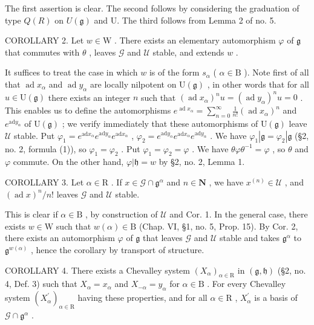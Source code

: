 The first assertion is clear. The second follows by considering the graduation of type \(Q(R)\) on \(U(\mathfrak{g})\) and U. The third follows from Lemma 2 of no. 5.

COROLLARY 2. Let \(w \in \mathrm{W}\) . There exists an elementary automorphism \(\varphi\) of \(\mathfrak{g}\) that commutes with \(\theta\) , leaves \(\mathcal{G}\) and \(\mathcal{U}\) stable, and extends \(w\) .

It suffices to treat the case in which \(w\) is of the form \(s_{\alpha}\) ( \(\alpha \in \mathrm{B}\) ). Note first of all that \(\operatorname{ad} x_{\alpha}\) and \(\operatorname{ad} y_{\alpha}\) are locally nilpotent on \(\mathrm{U}(\mathfrak{g})\) , in other words that for all \(u \in \mathrm{U}(\mathfrak{g})\) there exists an integer \(n\) such that \((\operatorname{ad} x_{\alpha})^n u = (\operatorname{ad} y_{\alpha})^n u = 0\) . This enables us to define the automorphisms \(e^{\operatorname{ad} x_{\alpha}} = \sum_{n=0}^{\infty} \frac{1}{n!} (\operatorname{ad} x_{\alpha})^n\) and \(e^{\mathrm{ad}y_{\alpha}}\) of \(\mathrm{U}(\mathfrak{g})\) ; we verify immediately that these automorphisms of \(\mathrm{U}(\mathfrak{g})\) leave \(\mathcal{U}\) stable. Put \(\varphi_1 = e^{\mathrm{ad}x_\alpha}e^{\mathrm{ad}y_\alpha}e^{\mathrm{ad}x_\alpha}\) , \(\varphi_2 = e^{\mathrm{ad}y_\alpha}e^{\mathrm{ad}x_\alpha}e^{\mathrm{ad}y_\alpha}\) . We have \(\varphi_1|\mathfrak{g} = \varphi_2|\mathfrak{g}\) (§2, no. 2, formula (1)), so \(\varphi_1 = \varphi_2\) . Put \(\varphi_1 = \varphi_2 = \varphi\) . We have \(\theta \varphi \theta^{-1} = \varphi\) , so \(\theta\) and \(\varphi\) commute. On the other hand, \(\varphi |\mathfrak{h} = w\) by §2, no. 2, Lemma 1.

COROLLARY 3. Let \(\alpha \in \mathrm{R}\) . If \(x \in \mathcal{G} \cap \mathfrak{g}^{\alpha}\) and \(n \in \mathbf{N}\) , we have \(x^{(n)} \in \mathcal{U}\) , and \((\operatorname{ad} x)^n / n!\) leaves \(\mathcal{G}\) and \(\mathcal{U}\) stable.

This is clear if \(\alpha \in \mathrm{B}\) , by construction of \(\mathcal{U}\) and Cor. 1. In the general case, there exists \(w \in \mathrm{W}\) such that \(w(\alpha) \in \mathrm{B}\) (Chap. VI, §1, no. 5, Prop. 15). By Cor. 2, there exists an automorphism \(\varphi\) of \(\mathfrak{g}\) that leaves \(\mathcal{G}\) and \(\mathcal{U}\) stable and takes \(\mathfrak{g}^{\alpha}\) to \(\mathfrak{g}^{w(\alpha)}\) , hence the corollary by transport of structure.

COROLLARY 4. There exists a Chevalley system \((X_{\alpha})_{\alpha \in \mathrm{R}}\) in \((\mathfrak{g},\mathfrak{h})\) (§2, no. 4, Def. 3) such that \(X_{\alpha} = x_{\alpha}\) and \(X_{-\alpha} = y_{\alpha}\) for \(\alpha \in \mathrm{B}\) . For every Chevalley system \((X_{\alpha}^{\prime})_{\alpha \in \mathrm{R}}\) having these properties, and for all \(\alpha \in \mathrm{R}\) , \(X_{\alpha}^{\prime}\) is a basis of \(\mathcal{G} \cap \mathfrak{g}^{\alpha}\) .

